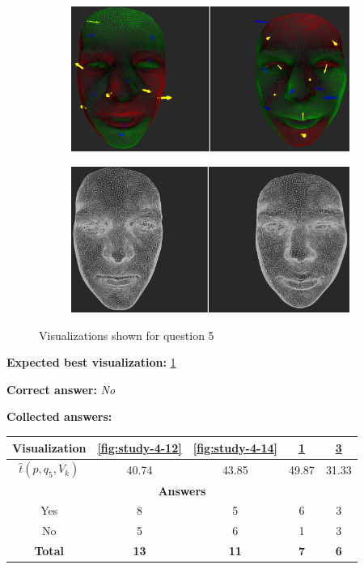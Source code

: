 \begin{figure}[h]
\begin{subfigure}{0.4\textwidth}
\includegraphics[width=\textwidth]{./screenshots/pair11.PNG}
\caption{}
\label{fig:study-4-11}
\end{subfigure}
\quad
\begin{subfigure}{0.4\textwidth}
\includegraphics[width=\textwidth]{./screenshots/pair13.PNG}
\caption{}
\label{fig:study-4-13}
\end{subfigure}
\caption{Visualizations shown for question 5}
\end{figure}
\medskip

{\bf Expected best visualization:} \ref{fig:study-4-11}
\medskip

{\bf Correct answer:} {\it No}
\medskip

{\bf Collected answers:}

\begin{center}
\begin{tabular}{| c | c | c | c | c |}
	\hline
	Visualization & \ref{fig:study-4-12} & \ref{fig:study-4-14} & \ref{fig:study-4-11} & \ref{fig:study-4-13}\\ \hline
	\(\widehat{t}(p, q_5, V_k)\) & 40.74 & 43.85 & 49.87 & 31.33\\ \hline
	\multicolumn{5}{|c|}{\bf Answers} \\ \hline
	Yes & 8 & 5 & 6 & 3\\ \hline
	\rowcolor{yellow!30} No & 5 & 6 & 1 & 3\\ \hline
	{\bf Total} & {\bf 13} & {\bf 11} & {\bf 7} & {\bf 6}\\ \hline
\end{tabular}
\end{center}
\clearpage


